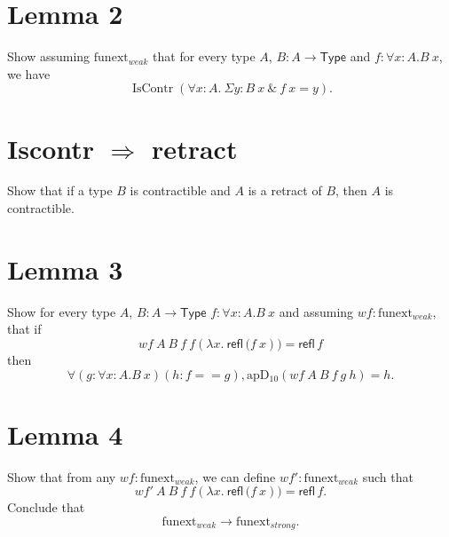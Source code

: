 \documentclass{article}
\newcommand{\Type}{\mathsf{Type}}
\newcommand{\refl}[1]{\mathsf{refl}\,{#1}}
\newcommand{\wFunext}{\mathrm{funext}_{weak}}
\newcommand{\sFunext}{\mathrm{funext}_{strong}}
\newcommand{\apD}{\mathrm{apD_{10}}}
\newcommand{\IsContr}{\mathop{\mathrm{IsContr}}}
\begin{document}
\section*{Lemma 2}

Show assuming $\wFunext$ that for every type $A$, $B : A
\rightarrow \Type$ and $f : \forall x:A. B \ x$, we have
 $$ \IsContr (\forall x:A. \ \Sigma y : B \ x \ \& \ f \ x = y).$$

 \section*{Iscontr $\Rightarrow$ retract}

 Show that if a type $B$ is contractible and $A$ is a retract of $B$,
 then $A$ is contractible.

 \section*{Lemma 3}

 Show for every type $A$, $B : A
\rightarrow \Type$  $f : \forall x:A. B \ x$ and assuming $w\! f : \wFunext$, that if 
$$
w\! f \ A \ B \ f \ f (\lambda x. \ \refl (f \ x)) = \refl f
$$
then 
$$
\forall (g : \forall x:A. B \ x)  (h: f == g), \apD (w\! f \ A \ B \ f \
g \ h) = h.
$$
 
 \section*{Lemma 4}

 Show that from any  $w\! f : \wFunext$, we can define $w\! f' : \wFunext$
such that  
$$
w\! f' \ A \ B \ f \ f (\lambda x. \ \refl (f \ x)) = \refl f.
$$
%
Conclude that
$$
\wFunext \rightarrow \sFunext.
$$
\end{document}
